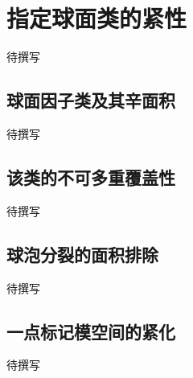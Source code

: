 
% 
% 

\section{指定球面类的紧性}
\label{g4:sec:2402}

待撰写

\subsection{球面因子类及其辛面积}
\label{g4:subsec:2402:01}
待撰写

\subsection{该类的不可多重覆盖性}
\label{g4:subsec:2402:02}
待撰写

\subsection{球泡分裂的面积排除}
\label{g4:subsec:2402:03}
待撰写

\subsection{一点标记模空间的紧化}
\label{g4:subsec:2402:04}
待撰写
